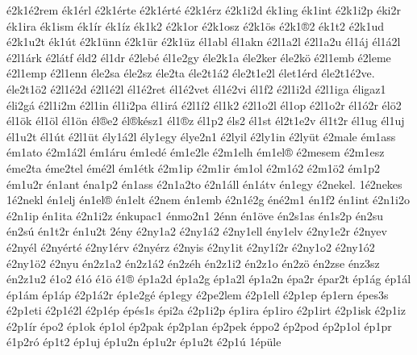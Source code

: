 {^^e92k1^^e92rem
^^e9k1^^e9rl
^^e92k1^^e9rte
^^e92k1^^e9rt^^e9
^^e92k1^^e9rz
^^e92k1i2d
^^e9k1ing
^^e9k1int
^^e92k1i2p
^^e9ki2r
^^e9k1ira
^^e9k1ism
^^e9k1^^edr
^^e9k1^^edz
^^e9k1k2
^^e92k1or
^^e92k1osz
^^e92k1^^f6s
^^e92k1^^ae2
^^e9k1t2
^^e92k1ud
^^e92k1u2t
^^e9k1^^fat
^^e92k1^^fcnn
^^e92k1^^fcr
^^e92k1^^fcz
^^e9l1abl
^^e9l1akn
^^e92l1a2l
^^e92l1a2u
^^e9l1^^e1j
^^e9l1^^e12l
^^e92l1^^e1rk
^^e92l^^e1tf
^^e9ld2
^^e9l1dr
^^e92leb^^e9
^^e9l1e2gy
^^e9le2k1a
^^e9le2ker
^^e9le2k^^f6
^^e92l1emb
^^e92leme
^^e92l1emp
^^e92l1enn
^^e9le2sa
^^e9le2sz
^^e9le2ta
^^e9le2t1^^e12
^^e9le2t1e2l
^^e9let1^^e9rd
^^e9le2t1^^e92ve.
^^e9le2t1^^f62
^^e92l1^^e92d
^^e92l1^^e92l
^^e9l1^^e92ret
^^e9l1^^e92vet
^^e9l1^^e92vi
^^e9l1f2
^^e92l1i2d
^^e92l1iga
^^e9ligaz1
^^e9li2g^^e1
^^e92l1i2m
^^e92l1in
^^e9l1i2pa
^^e9l1ir^^e1
^^e92l1^^ed2
^^e9l1k2
^^e92l1o2l
^^e9l1op
^^e92l1o2r
^^e9l1^^f32r
^^e9l^^f62
^^e9l1^^f6k
^^e9l1^^f6l
^^e9l1^^f6n
^^e9l^^aee2
^^e9l^^aek^^e9sz1
^^e9l1^^aez
^^e9l1p2
^^e9ls2
^^e9l1st
^^e9l2t1e2v
^^e9l1t2r
^^e9l1ug
^^e9l1uj
^^e9l1u2t
^^e9l1^^fat
^^e92l1^^fct
^^e9ly1^^e12l
^^e9ly1egy
^^e9lye2n1
^^e92lyil
^^e92ly1in
^^e92ly^^fct
^^e92male
^^e9m1ass
^^e9m1ato
^^e92m1^^e12l
^^e9m1^^e1ru
^^e9m1ed^^e9
^^e9m1e2le
^^e92m1elh
^^e9m1el^^ae
^^e92mesem
^^e92m1esz
^^e9me2ta
^^e9me2tel
^^e9m^^e92l
^^e9m1^^e9tk
^^e92m1ip
^^e92m1ir
^^e9m1ol
^^e92m1^^f32
^^e92m1^^f62
^^e9m1p2
^^e9m1u2r
^^e9n1ant
^^e9na1p2
^^e9n1ass
^^e92n1a2to
^^e92n1^^e1ll
^^e9n1^^e1tv
^^e9n1egy
^^e92nekel.
1^^e92nekes
1^^e92nekl
^^e9n1elj
^^e9n1el^^ae
^^e9n1elt
^^e92nem
^^e9n1emb
^^e92n1^^e92g
^^e9n^^e92m1
^^e9n1f2
^^e9n1int
^^e92n1i2o
^^e92n1ip
^^e9n1ita
^^e92n1i2z
^^e9nkupac1
^^e9nmo2n1
2^^e9nn
^^e9n1^^f6ve
^^e9n2s1as
^^e9n1s2p
^^e9n2su
^^e9n2s^^fa
^^e9n1t2r
^^e9n1u2t
2^^e9ny
^^e92ny1a2
^^e92ny1^^e12
^^e92ny1ell
^^e9ny1elv
^^e92ny1e2r
^^e92nyev
^^e92ny^^e9l
^^e92ny^^e9rt^^e9
^^e92ny1^^e9rv
^^e92ny^^e9rz
^^e92nyis
^^e92ny1it
^^e92ny1^^ed2r
^^e92ny1o2
^^e92ny1^^f32
^^e92ny1^^f62
^^e92nyu
^^e9n2z1a2
^^e9n2z1^^e12
^^e9n2z^^e9h
^^e9n2z1i2
^^e9n2z1o
^^e9n2z^^f6
^^e9n2zse
^^e9nz3sz
^^e9n2z1u2
^^e91o2
^^e91^^f3
^^e91^^f6
^^e91^^ae
^^e9p1a2d
^^e9p1a2g
^^e9p1a2l
^^e9p1a2n
^^e9pa2r
^^e9par2t
^^e9p1^^e1g
^^e9p1^^e1l
^^e9p1^^e1m
^^e9p1^^e1p
^^e92p1^^e12r
^^e9p1e2g^^e9
^^e9p1egy
^^e92pe2lem
^^e92p1ell
^^e92p1ep
^^e9p1ern
^^e9pes3s
^^e92p1eti
^^e92p1^^e92l
^^e92p1^^e9p
^^e9p^^e9s1s
^^e9pi2a
^^e92p1i2p
^^e9p1ira
^^e9p1iro
^^e92p1irt
^^e92p1isk
^^e92p1iz
^^e92p1^^edr
^^e9po2
^^e9p1ok
^^e9p1ol
^^e9p2pak
^^e9p2p1an
^^e9p2pek
^^e9ppo2
^^e9p2pod
^^e9p2p1ol
^^e9p1pr
^^e91p2r^^f3
^^e9p1t2
^^e9p1uj
^^e9p1u2n
^^e9p1u2r
^^e9p1u2t
^^e92p1^^fa
1^^e9p^^fcle
}
